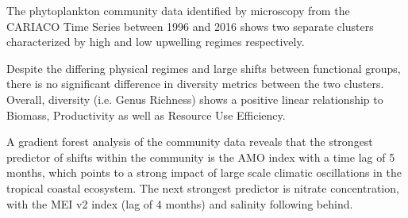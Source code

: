 \documentclass[draft]{agujournal2019}
\begin{document}






\begin{keypoints}
\item The phytoplankton community data identified by microscopy from the CARIACO Time Series between 1996 and 2016 shows two separate clusters characterized by high and low upwelling regimes respectively.
\item Despite the differing physical regimes and large shifts between functional groups, there is no significant difference in diversity metrics between the two clusters. Overall, diversity (i.e. Genus Richness) shows a positive linear relationship to Biomass, Productivity as well as Resource Use Efficiency.
\item A gradient forest analysis of the community data reveals that the strongest predictor of shifts within the community is the AMO index with a time lag of 5 months, which points to a strong impact of large scale climatic oscillations in the tropical coastal ecosystem. The next strongest predictor is nitrate concentration, with the MEI v2 index (lag of 4 months) and salinity following behind. 
\end{keypoints}

%
%
\end{document}
